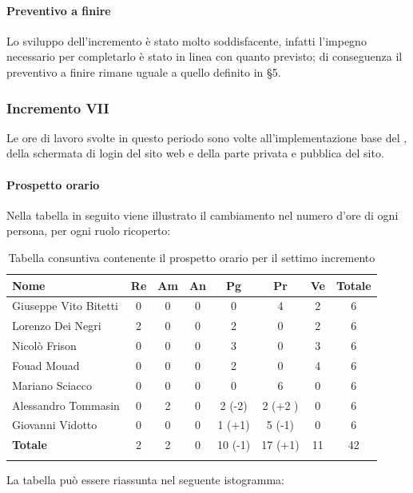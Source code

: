 			\paragraph{Preventivo a finire}
				Lo sviluppo dell'incremento è stato molto soddisfacente, infatti l'impegno necessario per completarlo è stato in linea con quanto previsto; di conseguenza il preventivo a finire rimane uguale a quello definito in \S5.
		
		\subsubsection{Incremento VII}
			Le ore di lavoro svolte in questo periodo sono volte all'implementazione base del , della schermata di login del sito web e della parte privata e pubblica del sito.
			\paragraph{Prospetto orario}
			Nella tabella in seguito viene illustrato il cambiamento nel numero d'ore di ogni persona, per ogni ruolo ricoperto:
		
			\begin{longtable}{|l|c|c|c|c|c|c|c|}
				\hline
				\rowcolor{lighter-grayer}
				\textbf{Nome} & \textbf{Re} & \textbf{Am} & \textbf{An} & \textbf{Pg}  & \textbf{Pr}   & \textbf{Ve} & \textbf{Totale} \\
				\hline
				\endfirsthead
				
				\hline
				Giuseppe Vito Bitetti 		 & 0 & 0 & 0 & 0 & 4 & 2 & 6\\
				\hline
				\hline
				Lorenzo Dei Negri			 & 2 & 0 & 0 & 2 & 0 & 2 & 6\\
				\hline
				\hline
				Nicolò Frison				      & 0 & 0 & 0 & 3 & 0 & 3 & 6\\
				\hline
				\hline
				Fouad Mouad 				   & 0 & 0 & 0 & 2 & 0 & 4 & 6\\
				\hline
				\hline
				Mariano Sciacco 			 & 0 & 0 & 0 & 0 & 6 & 0 & 6\\
				\hline
				\hline
				Alessandro Tommasin    & 0 & 2 & 0 & 2 (-2) & 2 (+2 )& 0 & 6\\
				\hline
				\hline
				Giovanni Vidotto 			  & 0 & 0 & 0 & 1 (+1) & 5 (-1) & 0 & 6\\
				\hline 
				\textbf{Totale}			 		& 2 & 2 & 0 & 10 (-1) & 17 (+1) & 11 & 42\\
				\hline
				\caption{Tabella consuntiva contenente il prospetto orario per il settimo incremento}
			\end{longtable}
		\pagebreak
		La tabella può essere riassunta nel seguente istogramma:
		
